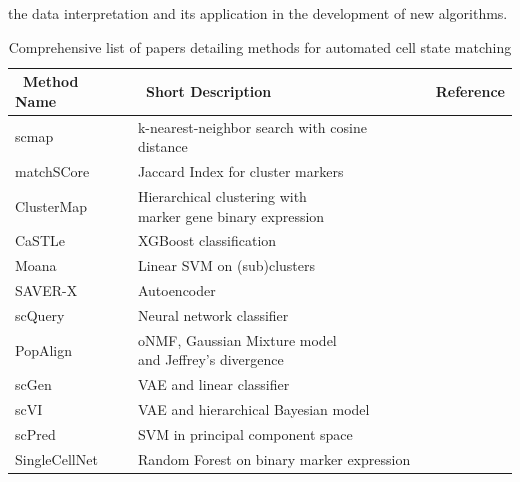the data interpretation and its application in the development of new algorithms.

\begin{table}[p] %
\caption{Comprehensive list of papers detailing methods for automated cell state matching}
\centering
\label{table:tab_1_1}
\begin{tabular}{l|l|c}
\toprule
~\textbf{Method Name} & ~\textbf{Short Description} & ~\textbf{Reference}  \\
\midrule
scmap & k-nearest-neighbor search with cosine distance & ~\citep{kiselev_scmap:_2018}  \\

matchSCore & Jaccard Index for cluster markers & ~\citep{mereu_matchscore:_2018}\\

ClusterMap & \specialcell[t]{Hierarchical clustering with\\marker gene binary expression} & ~\citep{gao_clustermap:_2018}\\

CaSTLe & XGBoost classification & ~\citep{lieberman_castle_2018}\\

Moana & Linear SVM on (sub)clusters & ~\citep{wagner_moana:_2018}\\

SAVER-X & Autoencoder & ~\citep{wang_transfer_2018}\\

scQuery & Neural network classifier & ~\citep{alavi_web_2018}\\

PopAlign & \specialcell[t]{oNMF, Gaussian Mixture model\\and Jeffrey’s divergence} & ~\citep{chen_dissecting_2018}\\

scGen & VAE and linear classifier & ~\citep{lotfollahi_generative_2018}\\

scVI & VAE and hierarchical Bayesian model & ~\citep{lopez_deep_2018}\\

scPred & SVM in principal component space & ~\citep{alquicira-hernandez_scpred:_2018}\\

SingleCellNet & Random Forest on binary marker expression & ~\citep{tan_singlecellnet:_2018}\\


\end{tabular}
\end{table}
